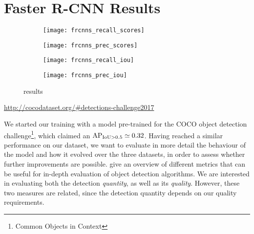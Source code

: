 
\section{Faster R-CNN Results}\label{sec:frcnn_results}

	\begin{figure}[ht]
		\begin{subfigure}{.49\linewidth}
			\texttt{[image: frcnns\_recall\_scores]}
			\caption{}
			\label{fig:frcnns_recall_scores}
		\end{subfigure}
		\begin{subfigure}{.49\linewidth}
			\texttt{[image: frcnns\_prec\_scores]}
			\caption{}
			\label{fig:frcnns_prec_scores}
		\end{subfigure}
		\begin{subfigure}{.49\linewidth}
			\texttt{[image: frcnns\_recall\_iou]}
			\caption{}
			\label{fig:frcnns_recall_iou}
		\end{subfigure}
		\begin{subfigure}{.49\linewidth}
			\texttt{[image: frcnns\_prec\_iou]}
			\caption{}
			\label{fig:frcnns_prec_iou}
		\end{subfigure}
		\caption{\FRCNN{} results}
		\label{fig:frcnn_results}
	\end{figure}

	\urldef{\cocoURL}\url{http://cocodataset.org/#detections-challenge2017}

	We started our training with a model pre-trained for the COCO object detection challenge\footnote{Common Objects in Context \cocoURL}, which claimed an \(\operatorname{\operatorname{AP}_{\operatorname{IoU} > 0.5}} \simeq 0.32\). Having reached a similar performance on our  dataset, we want to evaluate in more detail the behaviour of the model and how it evolved over the three datasets, in order to assess whether further improvements are possible.  give an overview of different metrics that can be useful for in-depth evaluation of object detection algorithms. We are interested in evaluating both the detection \emph{quantity}, as well as its \emph{quality}. However, these two measures are related, since the detection quantity depends on our quality requirements.


